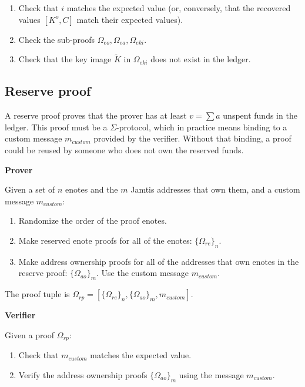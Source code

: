 \begin{appendices}
\begin{enumerate}
    \item Check that $i$ matches the expected value (or, conversely, that the recovered values $[K^o, C]$ match their expected values).

    \item Check the sub-proofs $\Omega_{eo}, \Omega_{ea}, \Omega_{eki}$.

    \item Check that the key image $\tilde{K}$ in $\Omega_{eki}$ does not exist in the ledger.
\end{enumerate}


\subsection{Reserve proof}
\label{appendix:jamtis-information-proofs-reserve}

A reserve proof proves that the prover has at least $v = \sum a$ unspent funds in the ledger. This proof must be a $\Sigma$-protocol, which in practice means binding to a custom message $m_{custom}$ provided by the verifier. Without that binding, a proof could be reused by someone who does not own the reserved funds.

\textbf{Prover}

Given a set of $n$ enotes and the $m$ Jamtis addresses that own them, and a custom message $m_{custom}$:

\begin{enumerate}
    \item Randomize the order of the proof enotes.

    \item Make reserved enote proofs for all of the enotes: $\{\Omega_{re}\}_n$.

    \item Make address ownership proofs for all of the addresses that own enotes in the reserve proof: $\{\Omega_{ao}\}_m$. Use the custom message $m_{custom}$.
\end{enumerate}

The proof tuple is $\Omega_{rp} = [\{\Omega_{re}\}_n, \{\Omega_{ao}\}_m, m_{custom}]$.

\textbf{Verifier}

Given a proof $\Omega_{rp}$:

\begin{enumerate}
    \item Check that $m_{custom}$ matches the expected value.

    \item Verify the address ownership proofs $\{\Omega_{ao}\}_m$ using the message $m_{custom}$.


\end{enumerate}
\end{appendices}
